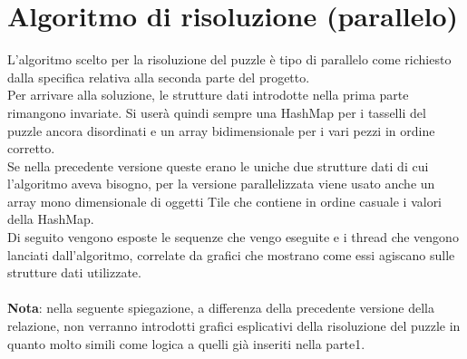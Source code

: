 % 
%
%

\section{Algoritmo di risoluzione (parallelo)} %
\label{sec:algoritmo_di_risoluzione_parallelo_}
L'algoritmo scelto per la risoluzione del puzzle è tipo di parallelo come richiesto dalla specifica relativa alla seconda parte del progetto. \\
Per arrivare alla soluzione, le strutture dati introdotte nella prima parte rimangono invariate. Si userà quindi sempre una HashMap per i tasselli del puzzle ancora disordinati e un array bidimensionale per i vari pezzi in ordine corretto. \\
Se nella precedente versione queste erano le uniche due strutture dati di cui l'algoritmo aveva bisogno, per la versione parallelizzata viene usato anche un array mono dimensionale di oggetti Tile che contiene in ordine casuale i valori della HashMap. \\
Di seguito vengono esposte le sequenze che vengo eseguite e i thread che vengono lanciati dall'algoritmo, correlate da grafici che mostrano come essi agiscano sulle strutture dati utilizzate. \\ \\
\textbf{Nota}: nella seguente spiegazione, a differenza della precedente versione della relazione, non verranno introdotti grafici esplicativi della risoluzione del puzzle in quanto molto simili come logica a quelli già inseriti nella parte1.

